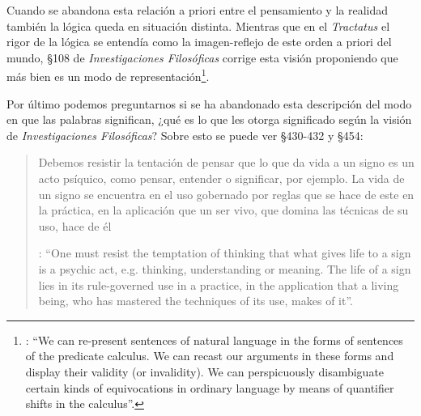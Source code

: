 Cuando se abandona esta relación a priori entre el pensamiento y la realidad también la lógica queda en situación distinta. Mientras que en el \emph{Tractatus} el rigor de la lógica se entendía como la imagen-reflejo de este orden a priori del mundo, \S108 de \emph{Investigaciones Filosóficas} corrige esta visión proponiendo que más bien es un modo de representación\footnote{\cite[242]{bakerhacker2009understanding}: \enquote{We can re-present sentences of natural language in the forms of sentences of the predicate calculus. We can recast our arguments in these forms and display their validity (or invalidity). We can perspicuously disambiguate certain kinds of equivocations in ordinary language by means of quantifier shifts in the calculus}.}.

Por último podemos preguntarnos si se ha abandonado esta descripción del modo en que las palabras significan, ¿qué es lo que les otorga significado según la visión de \emph{Investigaciones Filosóficas}? Sobre esto se puede ver \S430-432 y \S454: \blockquote[{\Cite[4]{hacker2000mind}}: \enquote{One must resist the temptation of thinking that what gives life to a sign is a psychic act, e.g. thinking, understanding or meaning. The life of a sign lies in its rule-governed use in a practice, in the application that a living being, who has mastered the techniques of its use, makes of it}.]{Debemos resistir la tentación de pensar que lo que da vida a un signo es un acto psíquico, como pensar, entender o significar, por ejemplo. La vida de un signo se encuentra en el uso gobernado por reglas que se hace de este en la práctica, en la aplicación que un ser vivo, que domina las técnicas de su uso, hace de él}.

